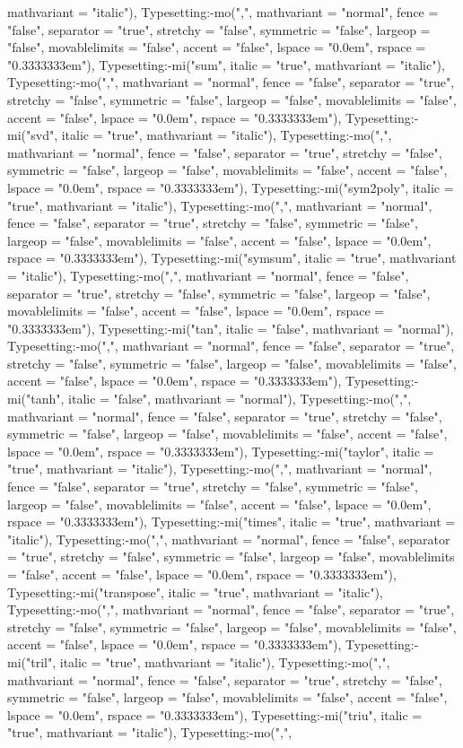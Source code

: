 \documentclass{article}
\begin{document}
{{{\begin{maplegroup}
\begin{maplelatex}
mathvariant = "italic"), Typesetting:-mo(",", mathvariant = "normal", fence = "false", separator = "true", stretchy = "false", symmetric = "false", largeop = "false", movablelimits = "false", accent = "false", lspace = "0.0em", rspace = "0.3333333em"), Typesetting:-mi("sum", italic = "true", mathvariant = "italic"), Typesetting:-mo(",", mathvariant = "normal", fence = "false", separator = "true", stretchy = "false", symmetric = "false", largeop = "false", movablelimits = "false", accent = "false", lspace = "0.0em", rspace = "0.3333333em"), Typesetting:-mi("svd", italic = "true", mathvariant = "italic"), Typesetting:-mo(",", mathvariant = "normal", fence = "false", separator = "true", stretchy = "false", symmetric = "false", largeop = "false", movablelimits = "false", accent = "false", lspace = "0.0em", rspace = "0.3333333em"), Typesetting:-mi("sym2poly", italic = "true", mathvariant = "italic"), Typesetting:-mo(",", mathvariant = "normal", fence = "false", separator = "true", stretchy = "false", symmetric = "false", largeop = "false", movablelimits = "false", accent = "false", lspace = "0.0em", rspace = "0.3333333em"), Typesetting:-mi("symsum", italic = "true", mathvariant = "italic"), Typesetting:-mo(",", mathvariant = "normal", fence = "false", separator = "true", stretchy = "false", symmetric = "false", largeop = "false", movablelimits = "false", accent = "false", lspace = "0.0em", rspace = "0.3333333em"), Typesetting:-mi("tan", italic = "false", mathvariant = "normal"), Typesetting:-mo(",", mathvariant = "normal", fence = "false", separator = "true", stretchy = "false", symmetric = "false", largeop = "false", movablelimits = "false", accent = "false", lspace = "0.0em", rspace = "0.3333333em"), Typesetting:-mi("tanh", italic = "false", mathvariant = "normal"), Typesetting:-mo(",", mathvariant = "normal", fence = "false", separator = "true", stretchy = "false", symmetric = "false", largeop = "false", movablelimits = "false", accent = "false", lspace = "0.0em", rspace = "0.3333333em"), Typesetting:-mi("taylor", italic = "true", mathvariant = "italic"), Typesetting:-mo(",", mathvariant = "normal", fence = "false", separator = "true", stretchy = "false", symmetric = "false", largeop = "false", movablelimits = "false", accent = "false", lspace = "0.0em", rspace = "0.3333333em"), Typesetting:-mi("times", italic = "true", mathvariant = "italic"), Typesetting:-mo(",", mathvariant = "normal", fence = "false", separator = "true", stretchy = "false", symmetric = "false", largeop = "false", movablelimits = "false", accent = "false", lspace = "0.0em", rspace = "0.3333333em"), Typesetting:-mi("transpose", italic = "true", mathvariant = "italic"), Typesetting:-mo(",", mathvariant = "normal", fence = "false", separator = "true", stretchy = "false", symmetric = "false", largeop = "false", movablelimits = "false", accent = "false", lspace = "0.0em", rspace = "0.3333333em"), Typesetting:-mi("tril", italic = "true", mathvariant = "italic"), Typesetting:-mo(",", mathvariant = "normal", fence = "false", separator = "true", stretchy = "false", symmetric = "false", largeop = "false", movablelimits = "false", accent = "false", lspace = "0.0em", rspace = "0.3333333em"), Typesetting:-mi("triu", italic = "true", mathvariant = "italic"), Typesetting:-mo(",", 
\end{maplelatex}
\end{maplegroup}}}}
\end{document}
